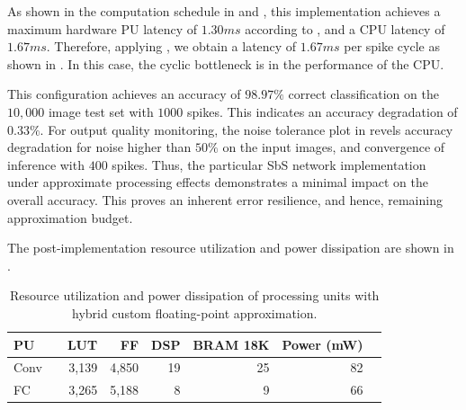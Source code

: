 As shown in the computation schedule in  and , this implementation achieves a maximum hardware PU latency of $1.30 ms$ according to , and a CPU latency of $1.67 ms$. Therefore, applying , we obtain a latency of $1.67 ms$ per spike cycle as shown in . In this case, the cyclic bottleneck is in the performance of the CPU.

This configuration achieves an accuracy of $98.97\%$ correct classification on the $10,000$ image test set with $1000$ spikes. This indicates an accuracy degradation of $0.33\%$. For output quality monitoring, the noise tolerance plot in  revels accuracy degradation for noise higher than $50\%$ on the input images, and convergence of inference with $400$ spikes. Thus, the particular SbS network implementation under approximate processing effects demonstrates a minimal impact on the overall accuracy. This proves an inherent error resilience, and hence, remaining approximation budget.

The post-implementation resource utilization and power dissipation
are shown in 
.

\begin{table}[h!]\centering
	\caption{Resource utilization and power dissipation of processing units with hybrid custom floating-point approximation.}\label{tab:resource_cfp}
	\scriptsize
	\begin{tabular}{lrrrrrrr}\toprule
		\textbf{PU} & &\textbf{LUT} &\textbf{FF} &\textbf{DSP} &\textbf{BRAM 18K} &\textbf{Power (mW)} \\\midrule
		Conv & &3,139 &4,850 &19 &25 &82 \\
		FC & &3,265 &5,188 &8 &9 &66 \\
		\bottomrule
	\end{tabular}
\end{table}



